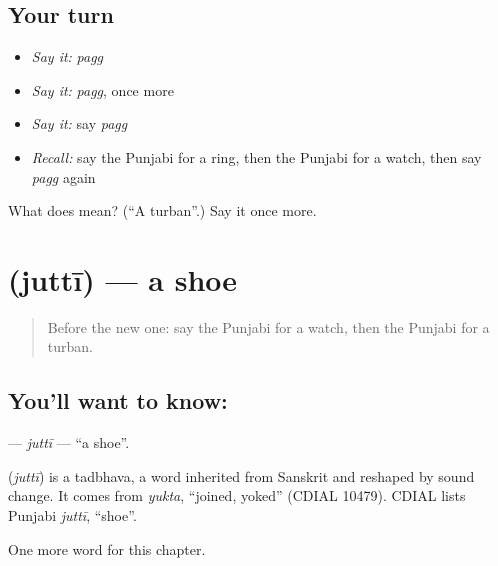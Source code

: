 \subsection*{Your turn}
\begin{itemize}
\raggedright
  \item \emph{Say it:} \emph{pagg}
  \item \emph{Say it:} \emph{pagg}, once more
  \item \emph{Say it:} say \emph{pagg}
  \item \emph{Recall:} say the Punjabi for a ring, then the Punjabi for a watch, then say \emph{pagg} again
\end{itemize}

\begin{tcolorbox}[breakable,colback=teal!4,colframe=teal!35!black,title={Before you move on}]
What does  mean? (\textquotedblleft{}A turban\textquotedblright{}.) Say it once more.
\end{tcolorbox}
\section[\texorpdfstring{\pa{ਜੁੱਤੀ} (juttī)}{ਜੁੱਤੀ (juttī)}]{ (juttī) — a shoe}

\label{lesson:PA-C94-jutti}



\begin{quote}
Before the new one: say the Punjabi for a watch, then the Punjabi for a turban.
\end{quote}

\subsection*{You'll want to know: }
\textbf{} — \emph{juttī} — \textquotedblleft{}a shoe\textquotedblright{}.

\begin{cousinweb}
\textbf{} (\emph{juttī}) is a tadbhava, a word inherited from Sanskrit and reshaped by sound change. It comes from \emph{yukta}, \textquotedblleft{}joined, yoked\textquotedblright{} (CDIAL 10479). CDIAL lists Punjabi \emph{juttī}, \textquotedblleft{}shoe\textquotedblright{}.
\end{cousinweb}

\begin{grammarlens}[title={What you've built}]
One more word for this chapter.
\end{grammarlens}

